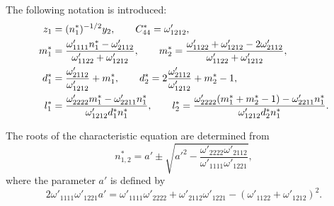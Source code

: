 The following notation is introduced:
\begin{align}
z_1 &= (n_1^*)^{-1/2} y_2,
\qquad
C_{44}^* = \omega'_{1212},
\notag \\
	m_1^* &=
	\frac{\omega'_{1111} n_1^* - \omega'_{2112}}
	{\omega'_{1122} + \omega'_{1212}}, \qquad
	m_2^* =
	\frac{\omega'_{1122} + \omega'_{1212} - 2\omega'_{2112}}
	{\omega'_{1122} + \omega'_{1212}}, 
	\notag \\
	d_1^* &=
	\frac{\omega'_{2112}}{\omega'_{1212}} + m_1^*, \qquad
	d_2^* =
	2\frac{\omega'_{2112}}{\omega'_{1212}}
	+
	m_2^*
	-
	1, 
	\label{BogdanovGuzEq9} \\
	l_1^* &=
	\frac{\omega'_{2222} m_1^* - \omega'_{2211} n_1^*}
	{\omega'_{1212} d_1^* n_1^*}, \qquad
	l_2^* =
	\frac{\omega'_{2222}(m_1^*+m_2^*-1) - \omega'_{2211} n_1^*}
	{\omega'_{1212} d_2^* n_1^*}.
	\notag
\end{align}

The roots of the characteristic equation are determined from
\begin{equation}
	\label{BogdanovGuzEq10}
	n_{1,2}^*
	=
	a'
	\pm
	\sqrt{
		a'^2
		-
		\frac{\omega'_{2222}\omega'_{2112}}
		{\omega'_{1111}\omega'_{1221}}
	},
\end{equation}
where the parameter $a'$ is defined by
\[
2\omega'_{1111}\omega'_{1221} a'
=
\omega'_{1111}\omega'_{2222}
+
\omega'_{2112}\omega'_{1221}
-
\left(\omega'_{1122}+\omega'_{1212}\right)^2.
\]

